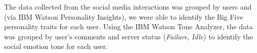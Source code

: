 \documentclass[graybox]{svmult}
\begin{document}
{The data collected from the social media interactions was grouped by users and (via IBM Watson Personality Insights),
we were able to identify the Big Five personality traits for each
user. Using the IBM Watson Tone Analyzer, the data was grouped by
user's comments and server status ({\emph{Failure}}, {\emph{Idle}}) to
identify the social emotion tone for each user. 


}
\end{document}

